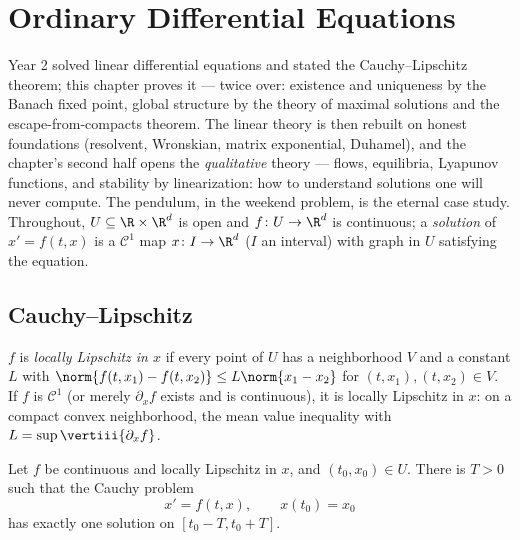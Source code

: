 \chapter{Ordinary Differential Equations}\label{ch:b3:ode}

Year 2 solved linear differential equations and stated the
Cauchy--Lipschitz theorem; this chapter proves it --- twice
over: existence and uniqueness by the Banach fixed point,
global structure by the theory of maximal solutions and the
escape-from-compacts theorem. The linear theory is then
rebuilt on honest foundations (resolvent, Wronskian, matrix
exponential, Duhamel), and the chapter's second half opens
the \emph{qualitative} theory --- flows, equilibria,
Lyapunov functions, and stability by linearization: how to
understand solutions one will never compute. The pendulum, in
the weekend problem, is the eternal case study. Throughout,
$U \subseteq \R\times\R^d$ is open and $f \colon U \to \R^d$
is continuous; a \emph{solution} of $x' = f(t, x)$ is a
$\mathcal C^1$ map $x \colon I \to \R^d$ ($I$ an interval)
with graph in $U$ satisfying the equation.

\section{Cauchy--Lipschitz}

\begin{definition}\label{def:b3:ode:lipschitz}
$f$ is \emph{locally Lipschitz in $x$}
if every point of $U$ has a neighborhood $V$ and a constant
$L$ with $\norm{f(t, x_1) - f(t, x_2)} \leq L\norm{x_1 -
x_2}$ for $(t, x_1), (t, x_2) \in V$. If $f$ is $\mathcal
C^1$ (or merely $\partial_xf$ exists and is continuous), it
is locally Lipschitz in $x$: on a compact convex
neighborhood, the mean value inequality with $L =
\sup\vertiii{\partial_xf}$.
\end{definition}

\begin{theorem}
\label{thm:b3:ode:cauchylipschitz}
Let $f$ be continuous and locally Lipschitz in $x$, and $(t_0,
x_0) \in U$. There is $T > 0$ such that the Cauchy problem
\[
x' = f(t, x), \qquad x(t_0) = x_0
\]
has exactly one solution on $[t_0 - T, t_0 +
T]$.
\end{theorem}

